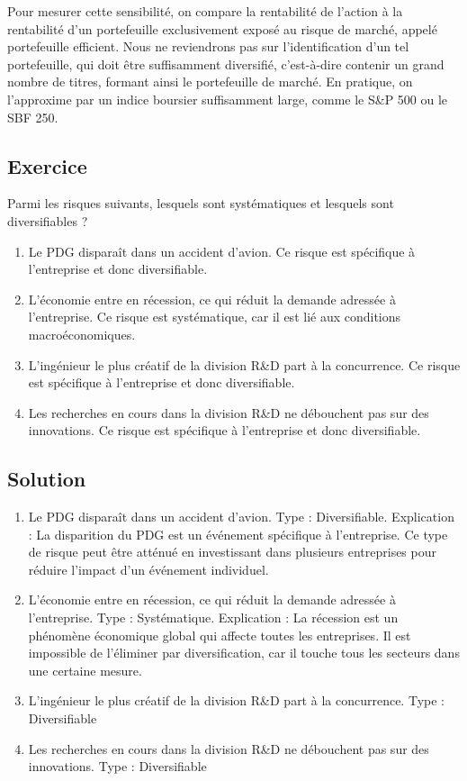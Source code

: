 \documentclass[a4paper, 12pt]{report}
\begin{document}
Pour mesurer cette sensibilité, on compare la rentabilité de l'action à la rentabilité d'un portefeuille exclusivement exposé au risque de marché, appelé portefeuille efficient. Nous ne reviendrons pas sur l'identification d'un tel portefeuille, qui doit être suffisamment diversifié, c'est-à-dire contenir un grand nombre de titres, formant ainsi le portefeuille de marché. En pratique, on l'approxime par un indice boursier suffisamment large, comme le S\&P 500 ou le SBF 250.

\subsection{Exercice}

Parmi les risques suivants, lesquels sont systématiques et lesquels sont diversifiables ?

\begin{enumerate}
	\item Le PDG disparaît dans un accident d'avion. Ce risque est spécifique à l'entreprise et donc diversifiable.
	\item L'économie entre en récession, ce qui réduit la demande adressée à l'entreprise. Ce risque est systématique, car il est lié aux conditions macroéconomiques.
	\item L'ingénieur le plus créatif de la division R\&D part à la concurrence. Ce risque est spécifique à l'entreprise et donc diversifiable.
	\item Les recherches en cours dans la division R\&D ne débouchent pas sur des innovations. Ce risque est spécifique à l'entreprise et donc diversifiable.
\end{enumerate}

\subsection{Solution}

\begin{enumerate}
	\item Le PDG disparaît dans un accident d'avion. Type : Diversifiable. Explication : La disparition du PDG est un événement spécifique à l’entreprise. Ce type de risque peut être atténué en investissant dans plusieurs entreprises pour réduire l'impact d'un événement individuel.
	\item L’économie entre en récession, ce qui réduit la demande adressée à l’entreprise. Type : Systématique. Explication : La récession est un phénomène économique global qui affecte toutes les entreprises. Il est impossible de l’éliminer par diversification, car il touche tous les secteurs dans une certaine mesure.
	\item L’ingénieur le plus créatif de la division R\&D part à la concurrence. Type : Diversifiable
	\item Les recherches en cours dans la division R\&D ne débouchent pas sur des innovations. Type : Diversifiable
\end{enumerate}
\end{document}

